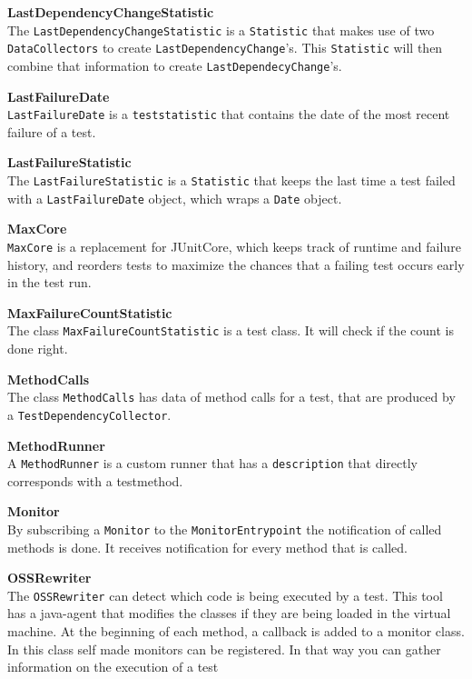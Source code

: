 \documentclass[i2]{oss}
\newcommand{\class}[1]{\texttt{#1}}
\newcommand{\gloss}[1]{\textbf{#1}}
\begin{document}
\begin{description}
\item \gloss{LastDependencyChangeStatistic} \\
The \class{LastDependencyChangeStatistic} is a \class{Statistic} that makes use of two \class{DataCollectors} to create \class{LastDependencyChange}'s. This \class{Statistic} will then combine that information to create \class{LastDependecyChange}'s.

\item \gloss{LastFailureDate} \\
\class{LastFailureDate} is a \class{teststatistic} that contains the date of the most recent failure of a test.

\item \gloss{LastFailureStatistic}\\
 The \class{LastFailureStatistic} is a \class{Statistic} that keeps the last time a test failed with a \class{LastFailureDate} object, which wraps a \class{Date} object.

\item \gloss{MaxCore} \\
\class{MaxCore} is a replacement for JUnitCore, which keeps track of runtime and failure history, and reorders tests to maximize the chances that a failing test occurs early in the test run.

\item \gloss{MaxFailureCountStatistic} \\
The class \class{MaxFailureCountStatistic} is a test class. It will check if the count is done right.

\item \gloss{MethodCalls} \\
The class \class{MethodCalls} has data of method calls for a test, that are produced by a \class{TestDependencyCollector}.

\item \gloss{MethodRunner}\\
A \class{MethodRunner} is a custom runner that has a \class{description} that directly corresponds with a testmethod.

\item \gloss{Monitor} \\
By subscribing a \class{Monitor} to the \class{MonitorEntrypoint} the notification of called methods is done. It receives notification for every method that is called.

\item \gloss{OSSRewriter}\\
The \class{OSSRewriter} can detect which code is being executed by a test. This tool has a java-agent that modifies the classes if they are being loaded in the virtual machine. At the beginning of each method, a callback is added to a monitor
class. In this class self made monitors can be registered. In that way you
can gather information on the execution of a test 


\end{description}
\end{document}
